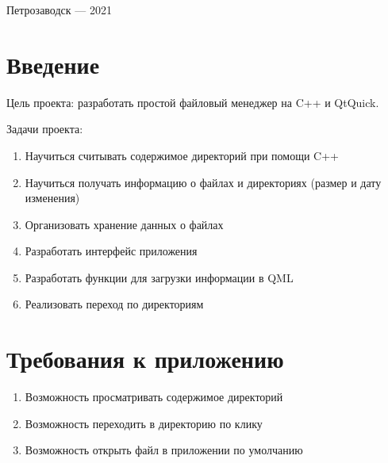\documentclass[a4paper,12pt]{article}
\begin{document}
\vfill

\begin{center}
    \large
    Петрозаводск --- 2021
\end{center}



\newpage

\tableofcontents





\newpage
\section*{Введение}

Цель проекта: разработать простой файловый менеджер на C++ и QtQuick.

Задачи проекта:
\begin{enumerate}
    \item Научиться считывать содержимое директорий при помощи C++
    \item Научиться получать информацию о файлах и директориях (размер и дату изменения)
    \item Организовать хранение данных о файлах
    \item Разработать интерфейс приложения
    \item Разработать функции для загрузки информации в QML
    \item Реализовать переход по директориям
\end{enumerate}


\section{Требования к приложению}
\begin{enumerate}
    \item Возможность просматривать содержимое директорий
    \item Возможность переходить в директорию по клику
    \item Возможность открыть файл в приложении по умолчанию
\end{enumerate}
\end{document}
